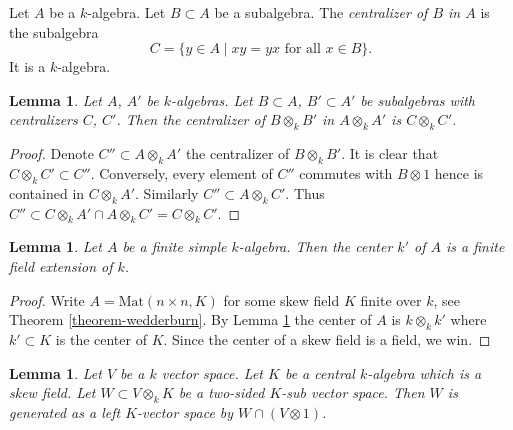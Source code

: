 \documentclass{stacks-project}
\theoremstyle{plain}
\newtheorem{lemma}[subsection]{Lemma}
\theoremstyle{definition}
\theoremstyle{remark}
\numberwithin{equation}{subsection}
\begin{document}
\noindent
Let $A$ be a $k$-algebra. Let $B \subset A$ be a subalgebra.
The {\it centralizer of $B$ in $A$} is the subalgebra
$$
C  = \{y \in A \mid xy = yx \text{ for all }x \in B\}.
$$
It is a $k$-algebra.

\begin{lemma}
\label{lemma-centralizer}
Let $A$, $A'$ be $k$-algebras. Let $B \subset A$, $B' \subset A'$ be
subalgebras with centralizers $C$, $C'$. Then the centralizer of
$B \otimes_k B'$ in $A \otimes_k A'$ is $C \otimes_k C'$.
\end{lemma}

\begin{proof}
Denote $C'' \subset A \otimes_k A'$ the centralizer of $B \otimes_k B'$.
It is clear that $C \otimes_k C' \subset C''$. Conversely, every element
of $C''$ commutes with $B \otimes 1$ hence is contained in $C \otimes_k A'$.
Similarly $C'' \subset A \otimes_k C'$. Thus
$C'' \subset C \otimes_k A' \cap A \otimes_k C' = C \otimes_k C'$.
\end{proof}

\begin{lemma}
\label{lemma-center-csa}
Let $A$ be a finite simple $k$-algebra. Then the center $k'$ of $A$
is a finite field extension of $k$.
\end{lemma}

\begin{proof}
Write $A = \text{Mat}(n \times n, K)$ for some skew field $K$ finite
over $k$, see
Theorem \ref{theorem-wedderburn}.
By
Lemma \ref{lemma-centralizer}
the center of $A$ is $k \otimes_k k'$ where $k' \subset K$ is the
center of $K$. Since the center of a skew field is a field, we win.
\end{proof}

\begin{lemma}
\label{lemma-generate-two-sided-sub}
Let $V$ be a $k$ vector space. Let $K$ be a central $k$-algebra
which is a skew field. Let $W \subset V \otimes_k K$ be a two-sided
$K$-sub vector space. Then $W$ is generated as a left $K$-vector
space by $W \cap (V \otimes 1)$.
\end{lemma}
\end{document}
